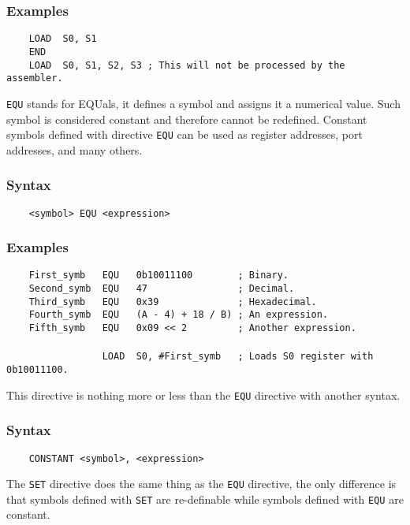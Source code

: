     \subsubsection{Examples}
        \verb'    LOAD  S0, S1'\\
        \verb'    END'\\
        \verb'    LOAD  S0, S1, S2, S3 ; This will not be processed by the assembler.'

\clearpage
{}
    \texttt{EQU} stands for EQUals, it defines a symbol and assigns it a numerical value. Such symbol is considered constant and therefore cannot be redefined. Constant symbols defined with directive \texttt{EQU} can be used as register addresses, port addresses, and many others.

    \subsubsection{Syntax}
        \verb'    <symbol> EQU <expression>'

    \subsubsection{Examples}
        \verb'    First_symb   EQU   0b10011100        ; Binary.'\\
        \verb'    Second_symb  EQU   47                ; Decimal.'\\
        \verb'    Third_symb   EQU   0x39              ; Hexadecimal.'\\
        \verb'    Fourth_symb  EQU   (A - 4) + 18 / B) ; An expression.'\\
        \verb'    Fifth_symb   EQU   0x09 << 2         ; Another expression.'\\
        \verb''\\
        \verb'                 LOAD  S0, #First_symb   ; Loads S0 register with 0b10011100.'

    This directive is nothing more or less than the \texttt{EQU} directive with another syntax.

    \subsubsection{Syntax}
        \verb'    CONSTANT <symbol>, <expression>'

\clearpage
{}
    The \texttt{SET} directive does the same thing as the \texttt{EQU} directive, the only difference is that symbols defined with \texttt{SET} are re-definable while symbols defined with \texttt{EQU} are constant.

